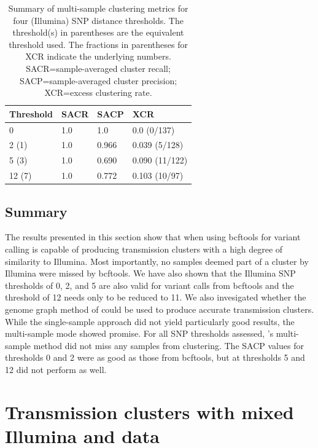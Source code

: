 \begin{table}
\centering
\begin{tabular}{llll}
Threshold & SACR  & SACP  & XCR            \\
\hline
0        & 1.0 & 1.0 & 0.0 (0/137) \\
\hline
2 (1)    & 1.0 & 0.966 & 0.039 (5/128) \\
\hline
5 (3)    & 1.0 & 0.690 & 0.090 (11/122) \\
\hline
12 (7)   & 1.0 & 0.772 & 0.103 (10/97)  
\end{tabular}
\caption{Summary of \pandora{} multi-sample clustering metrics for four (Illumina) SNP distance thresholds. The threshold(s) in parentheses are the \ont{} equivalent threshold used. The fractions in parentheses for XCR indicate the underlying numbers. SACR=sample-averaged cluster recall; SACP=sample-averaged cluster precision; XCR=excess clustering rate.}
\label{tab:compare-cluster-summary}
\end{table}

\subsection{Summary}
\label{sec:cluster-summary}

The results presented in this section show that when using bcftools for variant calling \ont{} is capable of producing transmission clusters with a high degree of similarity to Illumina. Most importantly, no samples deemed part of a cluster by Illumina were missed by bcftools. We have also shown that the Illumina SNP thresholds of 0, 2, and 5 are also valid for \ont{} variant calls from bcftools and the threshold of 12 needs only to be reduced to 11. 
We also invesigated whether the genome graph method of \pandora{} could be used to produce accurate transmission clusters. While the single-sample approach did not yield particularly good results, the multi-sample mode showed promise. For all SNP thresholds assessed, \pandora{}'s multi-sample method did not miss any samples from clustering. The SACP values for thresholds 0 and 2 were as good as those from bcftools, but at thresholds 5 and 12 \pandora{} did not perform as well. 


\section{Transmission clusters with mixed Illumina and \ont{} data}

